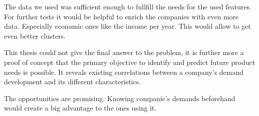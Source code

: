 The data we used was sufficient enough to fullfill the needs for the used features. For further tests
it would be helpful to enrich the companies with even more data. Especially economic ones like the
income per year. This would allow to get even better clusters.

This thesis could not give the final answer to the problem, it is further more a
proof of concept that the primary objective to identify and predict future product
needs is possible. It reveals existing correlations between a company's demand development
and its different characteristics.

The opportunities are promising. Knowing companie's demands beforehand would create a big
advantage to the ones using it.
